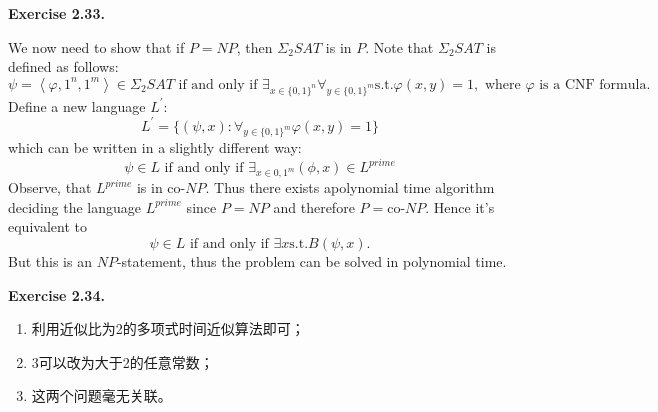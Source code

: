 \documentclass[a4paper]{article}
\newenvironment{exercise}[1]{
	\par
	\noindent\textbf{Exercise #1.}\quad
}{
	\par
	\bigskip
}
\begin{document}
\begin{exercise}{2.33}	
	We now need to show that if $P=NP$, then $\Sigma_2 SAT$ is in $P$. Note that $\Sigma_2 SAT$ is defined as follows:
	\begin{equation*}
	 \psi=\left\langle \varphi,1^{n},1^{m} \right\rangle \in  \Sigma_2 SAT  \text{   if and only if   } \exists_{x\in \{0,1\}^n} \forall_{y \in \{0,1 \}^m} \text{s.t.} \varphi(x,y)=1,\text{  where }\varphi \text{ is a CNF formula.} 
	\end{equation*}
	Define a new language $L^{\prime}$:
	\begin{equation*}
	     	L^{\prime}=\{(\psi,x): \forall_{y \in \{0,1\}^m} \varphi(x,y)=1\}
	\end{equation*}
	which can be written in a slightly different way:
	\begin{equation*}
		\psi \in L \text{  if and only if  } \exists_{x \in {0,1}^m} (\phi,x) \in L^{prime}
	\end{equation*}
	Observe, that $L^{prime}$ is in co-$NP$. Thus there exists apolynomial time algorithm deciding the language $L^{prime}$ since $P=NP$ and therefore $P=$co-$NP$. Hence it's equivalent to 
	\begin{equation*}
	       \psi \in L \text{  if and only if  } \exists x \text{s.t.} B(\psi,x). 
	\end{equation*}
	But this is an $NP$-statement, thus the problem can be solved in polynomial time.
\end{exercise}

	\begin{exercise}{2.34}
             \begin{enumerate}
	         \item 利用近似比为2的多项式时间近似算法即可；
		 \item 3可以改为大于2的任意常数；
		 \item 这两个问题毫无关联。
             \end{enumerate}
	\end{exercise}
\end{document}
